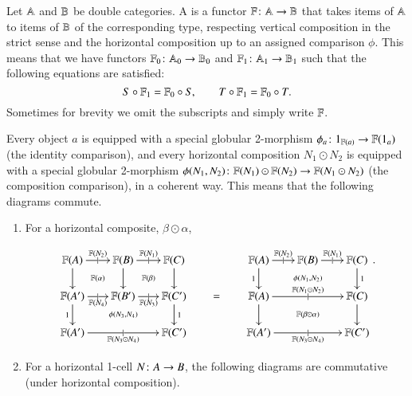 \documentclass[reqno]{amsart}
\begin{document}
\begin{defn}\label{def:doublefun}
Let $\mathbf{\mathbb A}$ and $\mathbf{\mathbb B}$ be double categories. A  is a functor $\mathbf{\mathbb F} \colon\mathbf{\mathbb A}\to \mathbf{\mathbb B}$ that takes items of $\mathbf{\mathbb A}$ to items of $\mathbf{\mathbb B}$ of the corresponding type, respecting vertical composition in the strict sense and the horizontal composition up to an assigned comparison $\phi$. This means that we have functors $\mathbf{\mathbb F}_0 \colon \mathbf{\mathbb A}_0 \to \mathbf{\mathbb B}_0$ and $\mathbf{\mathbb F}_1 \colon \mathbf{\mathbb A}_1 \to \mathbf{\mathbb B}_1$ such that the following equations are satisfied: 
\[   S \circ \mathbf{\mathbb F}_1 = \mathbf{\mathbb F}_0 \circ S, \qquad  T \circ \mathbf{\mathbb F}_1 = \mathbf{\mathbb F}_0 \circ T. \]
Sometimes for brevity we omit the subscripts and simply write $\mathbf{\mathbb F}$.

Every object $a$ is equipped with a special globular 2-morphism $\phi_{a} \colon 1_{\mathbf{\mathbb F}(a)} \to \mathbf{\mathbb F}(1_{a})$ (the identity comparison), and every horizontal composition $N_1 \odot N_{2}$ is equipped with a special globular 2-morphism $\phi(N_1,N_{2}) \colon \mathbf{\mathbb F}(N_1) \odot \mathbf{\mathbb F}(N_{2}) \to \mathbf{\mathbb F}(N_1 \odot N_{2})$ (the composition comparison), in a coherent way. This means that the following diagrams commute.

\begin{enumerate}

\item For a horizontal composite, $\beta \odot \alpha$,


\begin{equation}\label{eq:square}
  \xymatrix@-.5pc{
    \lF(A) \ar[r]|{|}^{\lF(N_{2})}  \ar[d] \ar@{}[dr]|{\lF(\alpha)}&
    \lF(B) \ar[d] \ar[r]|{|}^{\lF(N_1)} \ar@{}[dr]|{\lF(\beta)}&
    \lF(C) \ar[d] &
     &
    \lF(A) \ar[r]|{|}^{\lF(N_{2})} \ar@{}[drr]|{\phi(N_1,N_{2})} \ar[d]_1 &
    \lF(B) \ar[r]|{|}^{\lF(N_1)} &
    \lF(C) \ar[d]^{1} \\
    \lF(A') \ar[r]|{|}_{\lF(N_{4})} \ar@{}[drr]|{\phi(N_{3},N_{4})} \ar[d]_1&
    \lF(B') \ar[r]|{|}_{\lF(N_{3})} &
    \lF(C') \ar[d]^{1}&
    = &
    \lF(A) \ar[rr]|{|}^{\lF(N_1 \odot N_{2})} \ar[d] \ar@{}[drr]|{\lF(\beta \odot \alpha)}&
     &
    \lF(C) \ar[d] \\
    \lF(A') \ar[rr]|{|}_{\lF(N_{3} \odot N_{4})} & 
     & 
    \lF(C') &
     &
    \lF(A') \ar[rr]|{|}_{\lF(N_{3} \odot N_{4})} &
     &
    \lF(C') \\
  }.
\end{equation}

\item For a horizontal 1-cell $N \colon A \to B$, the following diagrams are commutative (under horizontal composition).


\end{enumerate}
\end{defn}
\end{document}
